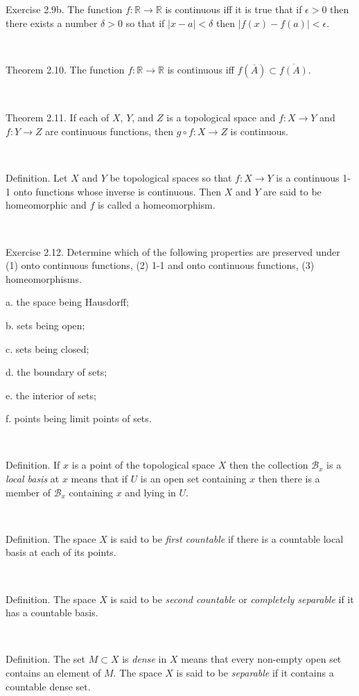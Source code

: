 \documentclass[12pt, std]{article}
\begin{document}
Exercise 2.9b.  The function $f: \mathbb{R} \rightarrow \mathbb{R}$
is continuous iff it is true that if $\epsilon > 0$ then there
exists a number $\delta > 0$ so that if $|x-a| < \delta$ then $|f(x)
- f(a)| < \epsilon$.

\

Theorem 2.10. The function $f: \mathbb{R} \rightarrow \mathbb{R}$ is
continuous iff $f(\overline{A}) \subset \overline{f(A)}$.

\

Theorem 2.11.  If each of $X$, $Y$, and $Z$ is a topological space
and $f: X \rightarrow Y $ and $f: Y \rightarrow Z$ are continuous
functions, then $g \circ f : X \rightarrow Z$ is continuous.

\

Definition.  Let $X$ and $Y$ be topological spaces so that $f: X
\rightarrow Y$ is a continuous 1-1 onto functions whose inverse is
continuous.  Then $X$ and $Y$ are said to be homeomorphic and $f$ is
called a homeomorphism.

\

Exercise 2.12.  Determine which of the following properties are
preserved under (1) onto continuous functions, (2) 1-1 and onto
continuous functions, (3) homeomorphisms.

\qquad a. the space being Hausdorff;

\qquad b. sets being open;

\qquad c. sets being closed;

\qquad d. the boundary of sets;

\qquad e. the interior of sets;

\qquad f. points being limit points of sets.

\

Definition.  If $x$ is a point of the topological space $X$ then the
collection $\mathcal{B}_x$ is a \textit{local basis} at $x$ means
that if $U$ is an open set containing $x$ then there is a member of
$\mathcal{B}_x$ containing $x$ and lying in $U$.

\

Definition.  The space $X$ is said to be \textit{first countable} if
there is a countable local basis at each of its points.

\

Definition.  The space $X$ is said to be \textit{second countable}
or \textit{completely separable} if it has a countable basis.

\

Definition. The set $M \subset X$ is \textit{dense} in $X$ means
that every non-empty open set contains an element of $M$.  The space $X$ is
said to be \textit{separable} if it contains a countable dense set.
\end{document}
